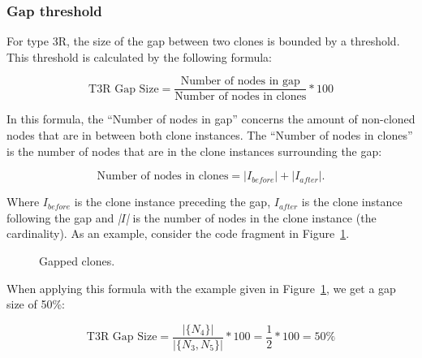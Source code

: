 \subsubsection{Gap threshold} \label{sec:t3rthreshold}
For type 3R, the size of the gap between two clones is bounded by a threshold. This threshold is calculated by the following formula:

\begin{equation}\label{eq:type3r}
\text{T3R Gap Size}=\frac{\text{Number of nodes in gap}}{\text{Number of nodes in clones}}*100
\end{equation}

In this formula, the ``Number of nodes in gap'' concerns the amount of non-cloned nodes that are in between both clone instances. The ``Number of nodes in clones'' is the number of nodes that are in the clone instances surrounding the gap:

\begin{equation}\label{eq:type3rclones}
\text{Number of nodes in clones}=|I_{before}| + |I_{after}|.
\end{equation}

Where $I_{before}$ is the clone instance preceding the gap, $I_{after}$ is the clone instance following the gap and \textit{|$I$|} is the number of nodes in the clone instance (the cardinality). As an example, consider the code fragment in Figure~\ref{fig:gappedclones}.

\begin{figure}[H]
\begin{parcolumns}{2}
\end{parcolumns}
\caption{Gapped clones.}
\label{fig:gappedclones}
\end{figure}

When applying this formula with the example given in Figure~\ref{fig:gappedclones}, we get a gap size of 50\%:

\begin{equation}\label{eq:type3rexample}
\text{T3R Gap Size}=\frac{|\{N_{4}\}|}{|\{N_{3}, N_{5}\}|}*100 = \frac{1}{2}*100 = 50\%
\end{equation}

